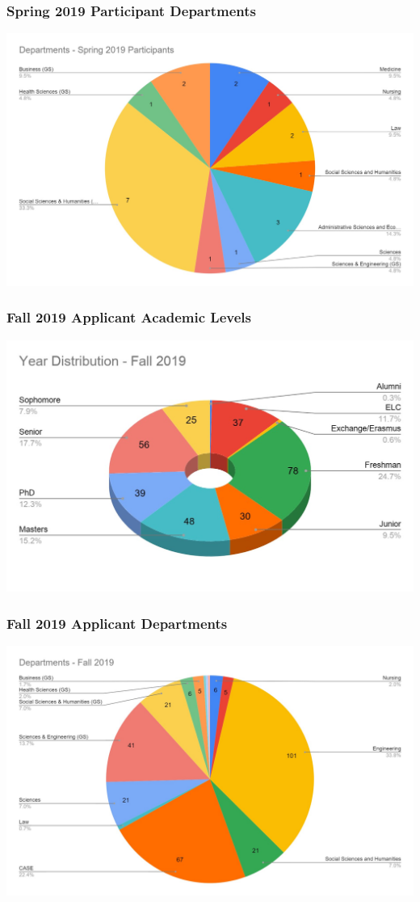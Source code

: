       \begin{frame}
        \frametitle{Spring 2019 Participant Departments}
        \centering
        \includegraphics[height=0.75\textheight]{images/departments_selected_spr2019.jpg}
      \end{frame}

      
      \begin{frame}
        \frametitle{Fall 2019 Applicant Academic Levels}
        \centering
        \includegraphics[height=0.75\textheight]{images/year_distribution_fall2019.jpg}
      \end{frame}

      \begin{frame}
        \frametitle{Fall 2019 Applicant Departments}
        \centering
        \includegraphics[height=0.75\textheight]{images/departments_fall2019.jpg}
      \end{frame}

